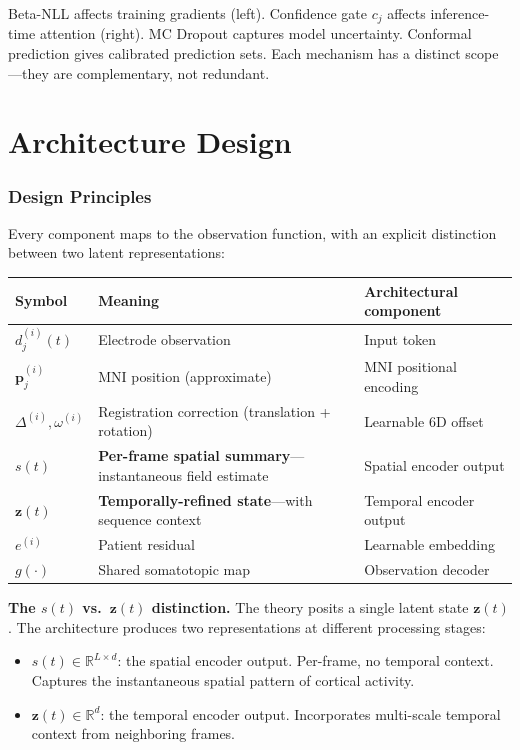 \documentclass[11pt,letterpaper]{article}
\newcommand{\bfp}{\mathbf{p}}
\newcommand{\bfz}{\mathbf{z}}
\newcommand{\R}{\mathbb{R}}
\begin{document}
\noindent Beta-NLL affects training gradients (left). Confidence gate $c_j$ affects inference-time attention (right). MC Dropout captures model uncertainty. Conformal prediction gives calibrated prediction sets. Each mechanism has a distinct scope---they are complementary, not redundant.



\part{Architecture Design}

\section{Design Principles}

Every component maps to the observation function, with an explicit distinction between two latent representations:

\begin{table}[h]\centering\small
\begin{tabular}{@{}lll@{}}
\toprule
\textbf{Symbol} & \textbf{Meaning} & \textbf{Architectural component} \\
\midrule
$d_j^{(i)}(t)$ & Electrode observation & Input token \\
$\bfp_j^{(i)}$ & MNI position (approximate) & MNI positional encoding \\
$\Delta^{(i)}, \omega^{(i)}$ & Registration correction (translation + rotation) & Learnable 6D offset \\
$s(t)$ & \textbf{Per-frame spatial summary}---instantaneous field estimate & Spatial encoder output \\
$\bfz(t)$ & \textbf{Temporally-refined state}---with sequence context & Temporal encoder output \\
$e^{(i)}$ & Patient residual & Learnable embedding \\
$g(\cdot)$ & Shared somatotopic map & Observation decoder \\
\bottomrule
\end{tabular}
\end{table}

\textbf{The $s(t)$ vs.\ $\bfz(t)$ distinction.} The theory posits a single latent state $\bfz(t)$. The architecture produces two representations at different processing stages:
\begin{itemize}[leftmargin=2em]
\item $s(t) \in \R^{L \times d}$: the spatial encoder output. Per-frame, no temporal context. Captures the instantaneous spatial pattern of cortical activity.
\item $\bfz(t) \in \R^d$: the temporal encoder output. Incorporates multi-scale temporal context from neighboring frames.
\end{itemize}
\end{document}
